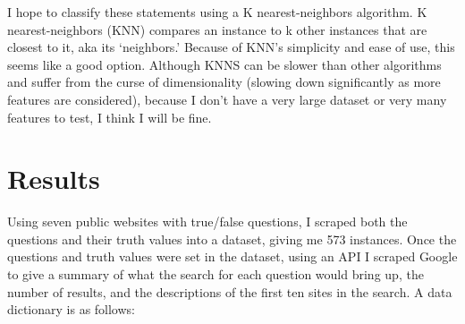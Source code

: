 \documentclass[]{article}
\begin{document}
		I hope to classify these statements using a K nearest-neighbors algorithm. K nearest-neighbors (KNN) compares an instance to k other instances that are closest to it, aka its `neighbors.' Because of KNN's simplicity and ease of use, this seems like a good option. Although KNNS can be slower than other algorithms and suffer from the curse of dimensionality (slowing down significantly as more features are considered), because I don't have a very large dataset or very many features to test, I think I will be fine.
		
			
		
		
		
	\section{Results}
		
		
		Using seven public websites with true/false questions, I scraped both the questions and their truth values into a dataset, giving me 573 instances. Once the questions and truth values were set in the dataset, using an API I scraped Google to give a summary of what the search for each question would bring up, the number of results, and the descriptions of the first ten sites in the search. A data dictionary is as follows:
		
\end{document}
